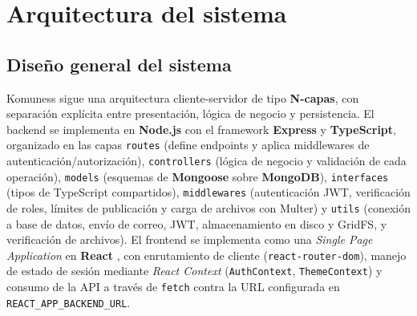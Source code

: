 \chapter{Arquitectura del sistema}
\section{Diseño general del sistema}

Komuness sigue una arquitectura cliente-servidor de tipo \textbf{N-capas}, con separación explícita entre presentación, lógica de negocio y persistencia. El backend se implementa en \textbf{Node.js} con el framework \textbf{Express} \cite{expressjs2024} y \textbf{TypeScript}, organizado en las capas \texttt{routes} (define endpoints y aplica middlewares de autenticación/autorización), \texttt{controllers} (lógica de negocio y validación de cada operación), \texttt{models} (esquemas de \textbf{Mongoose} \cite{mongoosejs2024} sobre \textbf{MongoDB}), \texttt{interfaces} (tipos de TypeScript compartidos), \texttt{middlewares} (autenticación JWT, verificación de roles, límites de publicación y carga de archivos con Multer) y \texttt{utils} (conexión a base de datos, envío de correo, JWT, almacenamiento en disco y GridFS, y verificación de archivos). El frontend se implementa como una \textit{Single Page Application} en \textbf{React} \cite{reactjs2024}, con enrutamiento de cliente (\texttt{react-router-dom}), manejo de estado de sesión mediante \textit{React Context} (\texttt{AuthContext}, \texttt{ThemeContext}) y consumo de la API a través de \texttt{fetch} contra la URL configurada en \texttt{REACT\_APP\_BACKEND\_URL}.

